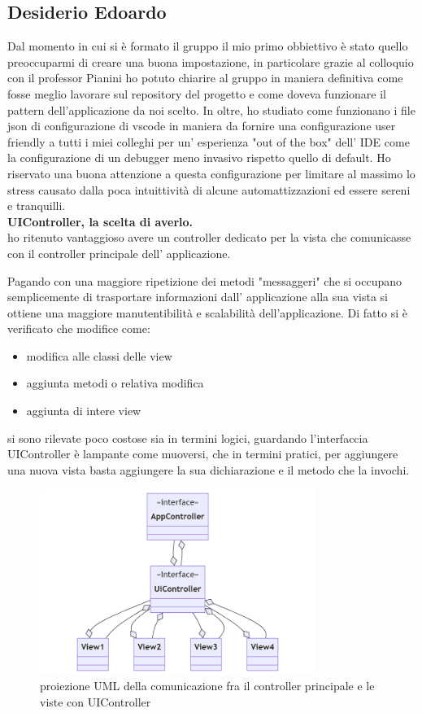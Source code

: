 \documentclass[a4paper,12pt]{report}
\begin{document}
\subsection{Desiderio Edoardo}
Dal momento in cui si è formato il gruppo il mio primo obbiettivo è stato quello preoccuparmi di creare una buona impostazione,
in particolare grazie al colloquio con il professor Pianini ho potuto chiarire al gruppo in maniera definitiva come fosse meglio
lavorare sul repository del progetto e come doveva funzionare il pattern dell'applicazione da noi scelto.
In oltre, ho studiato come funzionano i file json di configurazione di vscode in maniera da fornire una configurazione user friendly
a tutti i miei colleghi per un' esperienza "out of the box" dell' IDE come la configurazione di un debugger meno invasivo rispetto quello di  default.
Ho riservato una buona attenzione a questa configurazione per limitare al massimo lo stress causato dalla poca intuittività di alcune
automattizzazioni ed essere sereni e tranquilli.\\
\textbf{UIController, la scelta di averlo.}\\
ho ritenuto vantaggioso avere un controller dedicato per la vista  che comunicasse
con il controller principale dell' applicazione.

Pagando con una maggiore ripetizione dei metodi "messaggeri" che si occupano semplicemente di trasportare informazioni
dall' applicazione alla sua vista si ottiene una maggiore manutentibilità e scalabilità dell'applicazione.
Di fatto si è verificato che modifice come:
\begin{itemize}
    \item modifica alle classi delle view
    \item aggiunta metodi o relativa modifica
    \item aggiunta di intere view
\end{itemize}
si sono rilevate poco costose sia in termini logici, guardando l'interfaccia UIController è lampante come muoversi,
che in termini pratici, per aggiungere una nuova vista basta aggiungere la sua dichiarazione e il metodo che la invochi.
\begin{figure}[H]
    \centering
    \includegraphics[width=0.8\textwidth]{images/UiControllerDesing.png}
    \caption{proiezione UML della comunicazione fra il controller principale e le viste con UIController}
\end{figure}
\end{document}
